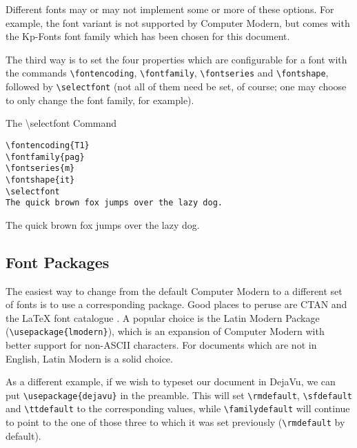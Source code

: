 \documentclass[a4paper,oneside,11pt]{article}
\newcommand\compar[2]{\texttt{\textbackslash #1\{#2\}}}
\newcommand\comm[1]{\texttt{\textbackslash#1}}
\begin{document}
Different fonts  may or may not  implement some or more  of these options. For
example, the    font variant is not  supported by
Computer Modern, but comes with the Kp-Fonts font family which has been chosen
for this document.

The third way is to set the  four properties which are configurable for a font
with the commands \verb|\fontencoding|, \verb|\fontfamily|, \verb|\fontseries|
and \verb|\fontshape|, followed by \verb|\selectfont| (not all of them need be
set,  of  course;  one  may  choose  to  only  change  the  font  family,  for
example).


\begin{titled-frame}
{\textsf{The \textbackslash{}selectfont Command}}
\vspace{-1em}
\begin{verbatim}
\fontencoding{T1}
\fontfamily{pag}
\fontseries{m}
\fontshape{it}
\selectfont
The quick brown fox jumps over the lazy dog.
\end{verbatim}
\selectfont
The quick brown fox jumps over the lazy dog.
\end{titled-frame}


\subsection{Font Packages}
\label{subsec:font-packages}

The easiest way to change from the  default Computer Modern to a different set
of fonts  is to use  a corresponding package. Good  places to peruse  are CTAN
\cite{ctan:fonts} and  the \LaTeX{} font  catalogue \cite{tug:font-catalog}. A
popular  choice is  the  Latin  Modern Package  (\verb|\usepackage{lmodern}|),
which is  an expansion of  Computer Modern  with better support  for non-ASCII
characters. For documents  which are not in  English, Latin Modern is  a solid
choice.

As  a  different example,  if  we  wish to  typeset  our  document in  DejaVu,
we  can  put  \compar{usepackage}{dejavu}{}  in the  preamble. This  will  set
\comm{rmdefault}, \comm{sfdefault}  and \comm{ttdefault} to  the corresponding
values, while \comm{familydefault} will continue to  point to the one of those
three to which it was set previously (\comm{rmdefault} by default).
\end{document}
